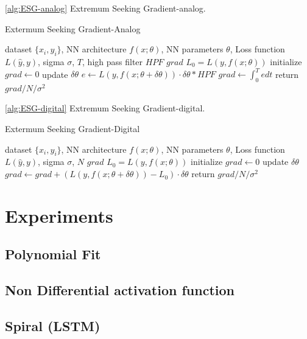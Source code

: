\documentclass[nohyperref]{article}
\theoremstyle{plain}
\theoremstyle{definition}
\theoremstyle{remark}
\begin{document}
\cref{alg:ESG-analog} Extremum Seeking Gradient-analog.

\begin{algorithm}[tb]
   \caption{Extermum Seeking Gradient-Analog}
   \label{alg:ESG-analog}
\begin{algorithmic}
   dataset $\{x_{i},y_{i}\}$, NN architecture $f(x;\theta)$, NN parameters $\theta$, Loss function $L(\hat{y},y)$, sigma $\sigma$, $T$, high pass filter $HPF$
   $grad$ 
   \STATE $L_{0} = L(y,f(x;\theta))$
   \STATE initialize $grad \leftarrow 0$
   \STATE update $\delta\theta$
   \STATE $e \leftarrow L(y,f(x;\theta+\delta \theta))\cdot\delta \theta*HPF$
   \STATE $grad \leftarrow \int_{0}^{T}e dt $ 
   \ENDFOR
   \STATE return $grad/N/\sigma^{2}$
\end{algorithmic}
\end{algorithm}

\cref{alg:ESG-digital} Extremum Seeking Gradient-digital.

\begin{algorithm}[tb]
   \caption{Extermum Seeking Gradient-Digital}
   \label{alg:ESG-digital}
\begin{algorithmic}
   dataset $\{x_{i},y_{i}\}$, NN architecture $f(x;\theta)$, NN parameters $\theta$, Loss function $L(\hat{y},y)$, sigma $\sigma$, $N$
   $grad$  
   \STATE $L_{0} = L(y,f(x;\theta))$
   \STATE initialize $grad \leftarrow 0$
   \STATE update $\delta\theta$
   \STATE $grad \leftarrow grad + (L(y,f(x;\theta+\delta \theta))-L_{0})\cdot\delta \theta$
   \ENDFOR
   \STATE return $grad/N/\sigma^{2}$
\end{algorithmic}
\end{algorithm}


\section{Experiments}
\subsection{Polynomial Fit}
\subsection{Non Differential activation function}
\subsection{Spiral (LSTM)}
\end{document}
